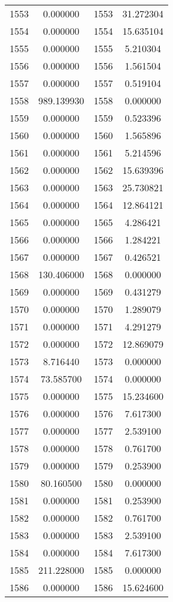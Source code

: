 \documentclass[12pt]{article}
\begin{document}
\begin{longtable}{@{}cccc@{}}
1553 & 0.000000 & 1553 & 31.272304 \\
1554 & 0.000000 & 1554 & 15.635104 \\
1555 & 0.000000 & 1555 & 5.210304 \\
1556 & 0.000000 & 1556 & 1.561504 \\
1557 & 0.000000 & 1557 & 0.519104 \\
1558 & 989.139930 & 1558 & 0.000000 \\
1559 & 0.000000 & 1559 & 0.523396 \\
1560 & 0.000000 & 1560 & 1.565896 \\
1561 & 0.000000 & 1561 & 5.214596 \\
1562 & 0.000000 & 1562 & 15.639396 \\
1563 & 0.000000 & 1563 & 25.730821 \\
1564 & 0.000000 & 1564 & 12.864121 \\
1565 & 0.000000 & 1565 & 4.286421 \\
1566 & 0.000000 & 1566 & 1.284221 \\
1567 & 0.000000 & 1567 & 0.426521 \\
1568 & 130.406000 & 1568 & 0.000000 \\
1569 & 0.000000 & 1569 & 0.431279 \\
1570 & 0.000000 & 1570 & 1.289079 \\
1571 & 0.000000 & 1571 & 4.291279 \\
1572 & 0.000000 & 1572 & 12.869079 \\
1573 & 8.716440 & 1573 & 0.000000 \\
1574 & 73.585700 & 1574 & 0.000000 \\
1575 & 0.000000 & 1575 & 15.234600 \\
1576 & 0.000000 & 1576 & 7.617300 \\
1577 & 0.000000 & 1577 & 2.539100 \\
1578 & 0.000000 & 1578 & 0.761700 \\
1579 & 0.000000 & 1579 & 0.253900 \\
1580 & 80.160500 & 1580 & 0.000000 \\
1581 & 0.000000 & 1581 & 0.253900 \\
1582 & 0.000000 & 1582 & 0.761700 \\
1583 & 0.000000 & 1583 & 2.539100 \\
1584 & 0.000000 & 1584 & 7.617300 \\
1585 & 211.228000 & 1585 & 0.000000 \\
1586 & 0.000000 & 1586 & 15.624600 \\

\end{longtable}
\end{document}
